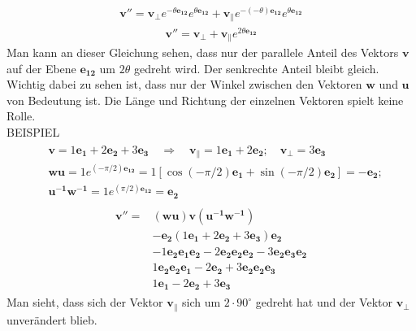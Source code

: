 \begin{align}
	\mathbf{v''} = \mathbf{v_\perp} e^{-\theta \mathbf{e_{12}}}  e^{\theta \mathbf{e_{12}}} +  \mathbf{v_\parallel} e^{-(-\theta) \mathbf{e_{12}}} e^{\theta \mathbf{e_{12}}}
\end{align}
\begin{align}
	\mathbf{v''} = \mathbf{v_\perp} +  \mathbf{v_\parallel} e^{2\theta \mathbf{e_{12}}}
\end{align}
Man kann an dieser Gleichung sehen, dass nur der parallele Anteil des Vektors $\mathbf{v}$ auf der Ebene $\mathbf{e_{12}}$ um $2\theta$ gedreht wird. Der senkrechte Anteil bleibt gleich. Wichtig dabei zu sehen ist, dass nur der Winkel zwischen den Vektoren $\mathbf{w}$ und $\mathbf{u}$ von Bedeutung ist. Die Länge und Richtung der einzelnen Vektoren spielt keine Rolle. 
\\BEISPIEL
\begin{align}
	\begin{split}
		&\mathbf{v} = 1\mathbf{e_1} + 2\mathbf{e_2} + 3\mathbf{e_3}\quad\Rightarrow\quad \mathbf{v_\parallel} = 1\mathbf{e_1} + 2\mathbf{e_2}; \quad \mathbf{v_\perp} = 3\mathbf{e_3}\\ &\mathbf{wu} = 1e^{(-\pi/2) \mathbf{e_{12}}} = 1[\cos(-\pi/2)\mathbf{e_1}+\sin(-\pi/2)\mathbf{e_2}] = -\mathbf{e_2}; \\ &\mathbf{u^{-1}w^{-1}} = 1e^{(\pi/2) \mathbf{e_{12}}} = \mathbf{e_2}
	\end{split}
\end{align}
\begin{align}
	\begin{split}
		\mathbf{v''} = &\mathbf{(wu)v(u^{-1}w^{-1})} \\ 
		&-\mathbf{e_2} (1\mathbf{e_1} + 2\mathbf{e_2} + 3\mathbf{e_3}) \mathbf{e_2} \\
		& -1\mathbf{e_2e_1e_2} - 2\mathbf{e_2e_2e_2} - 3\mathbf{e_2e_3e_2} \\
		& 1\mathbf{e_2e_2e_1} - 2\mathbf{e_2} + 3\mathbf{e_2e_2e_3} \\
		& 1\mathbf{e_1} - 2\mathbf{e_2} + 3\mathbf{e_3}
	\end{split}
\end{align}
Man sieht, dass sich der Vektor $\mathbf{v_\parallel}$ sich um $2\cdot90^\circ$ gedreht hat und der Vektor $\mathbf{v_\perp}$ unverändert blieb.
